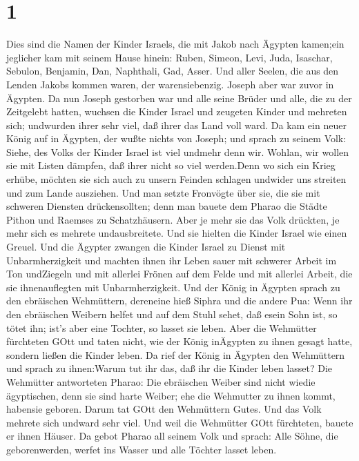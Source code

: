 \hypertarget{section}{%
\section{1}\label{section}}

 Dies sind die Namen der Kinder Israels, die mit Jakob nach
Ägypten kamen;ein jeglicher kam mit seinem Hause hinein: 
Ruben, Simeon, Levi, Juda,  Isaschar, Sebulon, Benjamin,
 Dan, Naphthali, Gad, Asser.  Und aller Seelen,
die aus den Lenden Jakobs kommen waren, der warensiebenzig. Joseph aber
war zuvor in Ägypten.  Da nun Joseph gestorben war und alle
seine Brüder und alle, die zu der Zeitgelebt hatten, 
wuchsen die Kinder Israel und zeugeten Kinder und mehreten sich;
undwurden ihrer sehr viel, daß ihrer das Land voll ward.  Da
kam ein neuer König auf in Ägypten, der wußte nichts von Joseph;
 und sprach zu seinem Volk: Siehe, des Volks der Kinder
Israel ist viel undmehr denn wir.  Wohlan, wir wollen sie
mit Listen dämpfen, daß ihrer nicht so viel werden.Denn wo sich ein
Krieg erhübe, möchten sie sich auch zu unsern Feinden schlagen undwider
uns streiten und zum Lande ausziehen.  Und man setzte
Fronvögte über sie, die sie mit schweren Diensten drückensollten; denn
man bauete dem Pharao die Städte Pithon und Raemses zu Schatzhäusern.
 Aber je mehr sie das Volk drückten, je mehr sich es
mehrete undausbreitete. Und sie hielten die Kinder Israel wie einen
Greuel.  Und die Ägypter zwangen die Kinder Israel zu
Dienst mit Unbarmherzigkeit  und machten ihnen ihr Leben
sauer mit schwerer Arbeit im Ton undZiegeln und mit allerlei Frönen auf
dem Felde und mit allerlei Arbeit, die sie ihnenauflegten mit
Unbarmherzigkeit.  Und der König in Ägypten sprach zu den
ebräischen Wehmüttern, dereneine hieß Siphra und die andere Pua:
 Wenn ihr den ebräischen Weibern helfet und auf dem Stuhl
sehet, daß esein Sohn ist, so tötet ihn; ist's aber eine Tochter, so
lasset sie leben.  Aber die Wehmütter fürchteten GOtt und
taten nicht, wie der König inÄgypten zu ihnen gesagt hatte, sondern
ließen die Kinder leben.  Da rief der König in Ägypten den
Wehmüttern und sprach zu ihnen:Warum tut ihr das, daß ihr die Kinder
leben lasset?  Die Wehmütter antworteten Pharao: Die
ebräischen Weiber sind nicht wiedie ägyptischen, denn sie sind harte
Weiber; ehe die Wehmutter zu ihnen kommt, habensie geboren.
 Darum tat GOtt den Wehmüttern Gutes. Und das Volk mehrete
sich undward sehr viel.  Und weil die Wehmütter GOtt
fürchteten, bauete er ihnen Häuser.  Da gebot Pharao all
seinem Volk und sprach: Alle Söhne, die geborenwerden, werfet ins Wasser
und alle Töchter lasset leben.

